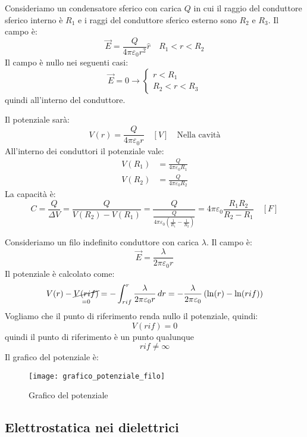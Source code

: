 \documentclass[a4paper]{article}
\begin{document}
\begin{example}
  Consideriamo un condensatore sferico con carica \( Q \) in cui il raggio del conduttore
  sferico interno è \( R_1 \) e i raggi del conduttore sferico esterno sono \( R_2 \) e
  \( R_3 \). Il campo è:
  \[
    \vec{E} = \frac{Q}{4 \pi \varepsilon_0 r^2} \hat{r} \quad R_1 < r < R_2
  \] 
  Il campo è nullo nei seguenti casi:
  \[
    \vec{E} = 0 \to \begin{cases}
      r < R_1\\
      R_2 < r < R_3
    \end{cases}
  \] 
  quindi all'interno del conduttore.

  Il potenziale sarà:
  \[
    V(r) = \frac{Q}{4 \pi \varepsilon_0 r} \quad \left[ V \right] \quad \text{Nella cavità}
  \] 
  All'interno dei conduttori il potenziale vale:
  \[
    \begin{aligned}
      V(R_1) &= \frac{Q}{4 \pi \varepsilon_0 R_1}\\
      V(R_2) &= \frac{Q}{4 \pi \varepsilon_0 R_2}
    \end{aligned}
  \] 
  La capacità è:
  \[
    C = \frac{Q}{\Delta V} = \frac{Q}{V(R_2) - V(R_1)}
    = \frac{Q}{\frac{Q}{4 \pi \varepsilon_0 \left( \frac{1}{R_1} - \frac{1}{R_2} \right)}}
    = 4 \pi \varepsilon_0 \frac{R_1 R_2}{R_2 - R_1} \quad \left[ F \right]
  \] 
\end{example}
\begin{example}
  Consideriamo un filo indefinito conduttore con carica \( \lambda \). Il campo
  è:
  \[
    \vec{E} = \frac{\lambda}{2 \pi \varepsilon_0 r}
  \] 
  Il potenziale è calcolato come:
  \[
    V(r) - \underset{=0}{\cancel{V(rif)}} = - \int_{rif}^r \frac{\lambda}{2 \pi \varepsilon_0 r} \, dr
    = - \frac{\lambda}{2 \pi \varepsilon_0} \left( \ln(r) - \ln(rif) \right) 
  \] 
  Vogliamo che il punto di riferimento renda nullo il potenziale, quindi:
  \[
    V(rif) = 0
  \] 
  quindi il punto di riferimento è un punto qualunque
  \[
    rif \neq \infty
  \] 
  Il grafico del potenziale è:
  \begin{figure}[H]
    \centering
    \texttt{[image: grafico\_potenziale\_filo]}
    \caption{Grafico del potenziale}
  \end{figure}
\end{example}

\subsection{Elettrostatica nei dielettrici}
\end{document}
